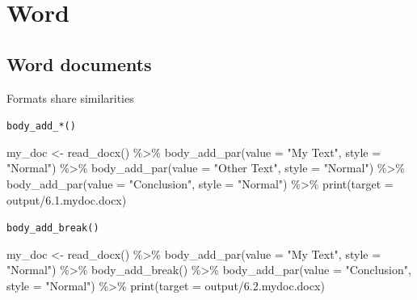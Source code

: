 \documentclass[
]{book}
\newenvironment{Shaded}{\begin{snugshade}}{\end{snugshade}}
\newcommand{\AttributeTok}[1]{\textcolor[rgb]{0.77,0.63,0.00}{#1}}
\newcommand{\FunctionTok}[1]{\textcolor[rgb]{0.00,0.00,0.00}{#1}}
\newcommand{\NormalTok}[1]{#1}
\newcommand{\OtherTok}[1]{\textcolor[rgb]{0.56,0.35,0.01}{#1}}
\newcommand{\SpecialCharTok}[1]{\textcolor[rgb]{0.00,0.00,0.00}{#1}}
\newcommand{\StringTok}[1]{\textcolor[rgb]{0.31,0.60,0.02}{#1}}
\begin{document}
\hypertarget{word}{%
\section{Word}\label{word}}

\hypertarget{word-documents}{%
\subsection{Word documents}\label{word-documents}}

Formats share similarities

\texttt{body\_add\_*()}

\begin{Shaded}
\begin{Highlighting}[]
\NormalTok{my\_doc }\OtherTok{\textless{}{-}} \FunctionTok{read\_docx}\NormalTok{() }\SpecialCharTok{\%\textgreater{}\%} 
  \FunctionTok{body\_add\_par}\NormalTok{(}\AttributeTok{value =} \StringTok{"My Text"}\NormalTok{, }\AttributeTok{style =} \StringTok{"Normal"}\NormalTok{) }\SpecialCharTok{\%\textgreater{}\%}
  \FunctionTok{body\_add\_par}\NormalTok{(}\AttributeTok{value =} \StringTok{"Other Text"}\NormalTok{, }\AttributeTok{style =} \StringTok{"Normal"}\NormalTok{) }\SpecialCharTok{\%\textgreater{}\%} 
  \FunctionTok{body\_add\_par}\NormalTok{(}\AttributeTok{value =} \StringTok{"Conclusion"}\NormalTok{, }\AttributeTok{style =} \StringTok{"Normal"}\NormalTok{) }\SpecialCharTok{\%\textgreater{}\%} 
  \FunctionTok{print}\NormalTok{(}\AttributeTok{target =} \StringTok{\textquotesingle{}output/6.1.mydoc.docx\textquotesingle{}}\NormalTok{)}
\end{Highlighting}
\end{Shaded}

\texttt{body\_add\_break()}

\begin{Shaded}
\begin{Highlighting}[]
\NormalTok{my\_doc }\OtherTok{\textless{}{-}} \FunctionTok{read\_docx}\NormalTok{() }\SpecialCharTok{\%\textgreater{}\%} 
  \FunctionTok{body\_add\_par}\NormalTok{(}\AttributeTok{value =} \StringTok{"My Text"}\NormalTok{, }\AttributeTok{style =} \StringTok{"Normal"}\NormalTok{) }\SpecialCharTok{\%\textgreater{}\%}
  \FunctionTok{body\_add\_break}\NormalTok{() }\SpecialCharTok{\%\textgreater{}\%} 
  \FunctionTok{body\_add\_par}\NormalTok{(}\AttributeTok{value =} \StringTok{"Conclusion"}\NormalTok{, }\AttributeTok{style =} \StringTok{"Normal"}\NormalTok{) }\SpecialCharTok{\%\textgreater{}\%} 
  \FunctionTok{print}\NormalTok{(}\AttributeTok{target =} \StringTok{\textquotesingle{}output/6.2.mydoc.docx\textquotesingle{}}\NormalTok{)}
\end{Highlighting}
\end{Shaded}
\end{document}
